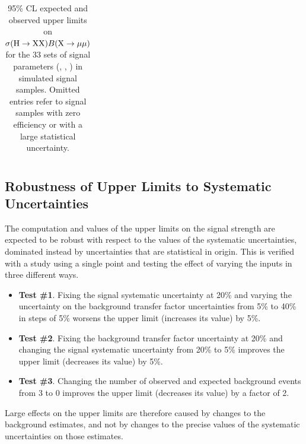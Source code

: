 \begin{table}
\begin{tabular}{lllll}
    \hline
  \end{tabular}
  \caption[95\% CL upper limits on $\sigma(\PHiggs\to \PLLP\PLLP)B(\PLLP\to\Pgm\Pgm)$ for the 33 sets of signal parameters (\mH, \mX, \cTau) in \twoMu simulated signal samples.]{95\% CL expected and observed upper limits on $\sigma(\PHiggs\to \PLLP\PLLP)B(\PLLP\to\Pgm\Pgm)$ for the 33 sets of signal parameters (\mH, \mX, \cTau) in \twoMu simulated signal samples. Omitted entries refer to signal samples with zero efficiency or with a large statistical uncertainty.}
  \label{tab:dd:limits}
\end{table}

\subsection{Robustness of Upper Limits to Systematic Uncertainties}
\label{sec:dd:robustness}
The computation and values of the upper limits on the signal strength are expected to be robust with respect to the values of the systematic uncertainties, dominated instead by uncertainties that are statistical in origin.
This is verified with a study using a single point and testing the effect of varying the inputs in three different ways.
\begin{itemize}
  \item \textbf{Test \#1}. Fixing the signal systematic uncertainty at 20\% and varying the uncertainty on the background transfer factor uncertainties from 5\% to 40\% in steps of 5\% worsens the upper limit (increases its value) by 5\%.
  \item \textbf{Test \#2}. Fixing the background transfer factor uncertainty at 20\% and changing the signal systematic uncertainty from 20\% to 5\% improves the upper limit (decreases its value) by 5\%.
  \item \textbf{Test \#3}. Changing the number of observed and expected background events from 3 to 0 improves the upper limit (decreases its value) by a factor of 2.
\end{itemize}
Large effects on the upper limits are therefore caused by changes to the background estimates, and not by changes to the precise values of the systematic uncertainties on those estimates.
